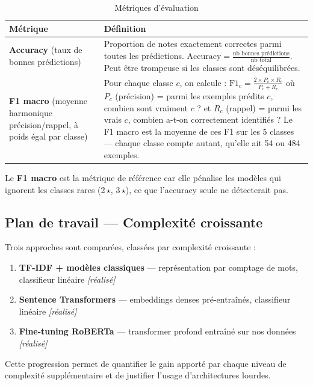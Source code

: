 \documentclass[12pt, a4paper]{article}
\begin{document}
\begin{table}[H]
  \centering
  \begin{tabular}{lp{10cm}}
    \toprule
    \textbf{Métrique} & \textbf{Définition} \\
    \midrule
    \textbf{Accuracy} (taux de bonnes prédictions) &
    Proportion de notes exactement correctes parmi toutes les prédictions.
    $\text{Accuracy} = \frac{\text{nb bonnes prédictions}}{\text{nb total}}$.
    Peut être trompeuse si les classes sont déséquilibrées. \\[0.5em]
    \textbf{F1 macro} (moyenne harmonique précision/rappel, à poids égal par classe) &
    Pour chaque classe $c$, on calcule :
    $\text{F1}_c = \frac{2 \times P_c \times R_c}{P_c + R_c}$
    où $P_c$ (précision) = parmi les exemples prédits $c$, combien sont vraiment $c$ ?
    et $R_c$ (rappel) = parmi les vrais $c$, combien a-t-on correctement identifiés ?
    Le F1 macro est la moyenne de ces F1 sur les 5 classes — chaque classe compte
    autant, qu'elle ait 54 ou 484 exemples. \\
    \bottomrule
  \end{tabular}
  \caption{Métriques d'évaluation}
\end{table}

Le \textbf{F1 macro} est la métrique de référence car elle pénalise les modèles
qui ignorent les classes rares (2\,$\star$, 3\,$\star$), ce que l'accuracy seule ne détecterait pas.

\subsection{Plan de travail — Complexité croissante}

Trois approches sont comparées, classées par complexité croissante :

\begin{enumerate}
  \item \textbf{TF-IDF + modèles classiques} — représentation par comptage de mots, classifieur linéaire \hfill \textit{[réalisé]}
  \item \textbf{Sentence Transformers} — embeddings denses pré-entraînés, classifieur linéaire \hfill \textit{[réalisé]}
  \item \textbf{Fine-tuning RoBERTa} — transformer profond entraîné sur nos données \hfill \textit{[réalisé]}
\end{enumerate}

Cette progression permet de quantifier le gain apporté par chaque niveau de complexité
supplémentaire et de justifier l'usage d'architectures lourdes.
\end{document}
